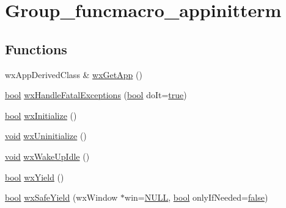 \hypertarget{group__group__funcmacro__appinitterm}{}\section{Group\+\_\+funcmacro\+\_\+appinitterm}
\label{group__group__funcmacro__appinitterm}
\subsection*{Functions}
\begin{DoxyCompactItemize}
\item 
wx\+App\+Derived\+Class \& \hyperlink{group__group__funcmacro__appinitterm_gac387a69e740a149f9888e4992a3a4c6c}{wx\+Get\+App} ()
\item 
\hyperlink{mac_2config_2i386_2lib-src_2libsoxr_2soxr-config_8h_abb452686968e48b67397da5f97445f5b}{bool} \hyperlink{group__group__funcmacro__appinitterm_ga28a4fb827b93fa6bac18c9666c23ee10}{wx\+Handle\+Fatal\+Exceptions} (\hyperlink{mac_2config_2i386_2lib-src_2libsoxr_2soxr-config_8h_abb452686968e48b67397da5f97445f5b}{bool} do\+It=\hyperlink{mac_2config_2i386_2lib-src_2libsoxr_2soxr-config_8h_a41f9c5fb8b08eb5dc3edce4dcb37fee7}{true})
\item 
\hyperlink{mac_2config_2i386_2lib-src_2libsoxr_2soxr-config_8h_abb452686968e48b67397da5f97445f5b}{bool} \hyperlink{group__group__funcmacro__appinitterm_gaa7b284f57a94442126d1e45faca5b4ad}{wx\+Initialize} ()
\item 
\hyperlink{sound_8c_ae35f5844602719cf66324f4de2a658b3}{void} \hyperlink{group__group__funcmacro__appinitterm_ga6aa1674945da924183f65de703aeafa3}{wx\+Uninitialize} ()
\item 
\hyperlink{sound_8c_ae35f5844602719cf66324f4de2a658b3}{void} \hyperlink{group__group__funcmacro__appinitterm_ga97206743f70b5382f9e2615217604d15}{wx\+Wake\+Up\+Idle} ()
\item 
\hyperlink{mac_2config_2i386_2lib-src_2libsoxr_2soxr-config_8h_abb452686968e48b67397da5f97445f5b}{bool} \hyperlink{group__group__funcmacro__appinitterm_gac386c89a04e364afc07edce6d848c27a}{wx\+Yield} ()
\item 
\hyperlink{mac_2config_2i386_2lib-src_2libsoxr_2soxr-config_8h_abb452686968e48b67397da5f97445f5b}{bool} \hyperlink{group__group__funcmacro__appinitterm_ga25abb4004fac0bcc0b937d93657c8cba}{wx\+Safe\+Yield} (wx\+Window $\ast$win=\hyperlink{px__mixer_8h_a070d2ce7b6bb7e5c05602aa8c308d0c4}{N\+U\+LL}, \hyperlink{mac_2config_2i386_2lib-src_2libsoxr_2soxr-config_8h_abb452686968e48b67397da5f97445f5b}{bool} only\+If\+Needed=\hyperlink{mac_2config_2i386_2lib-src_2libsoxr_2soxr-config_8h_a65e9886d74aaee76545e83dd09011727}{false})

\end{DoxyCompactItemize}
